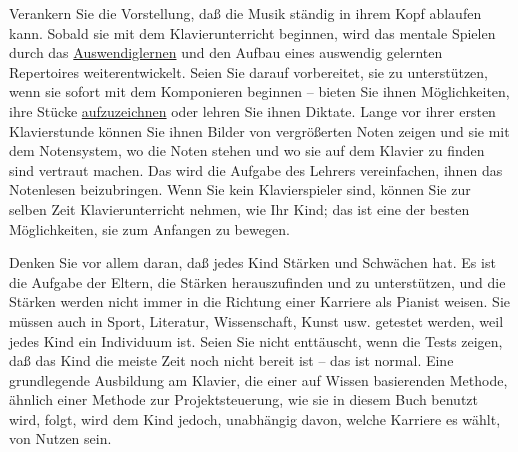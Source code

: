 Verankern Sie die Vorstellung, daß die Musik ständig in ihrem Kopf ablaufen kann.
Sobald sie mit dem Klavierunterricht beginnen, wird das mentale Spielen durch das \hyperref[c1iii6]{Auswendiglernen} und den Aufbau eines auswendig gelernten Repertoires weiterentwickelt.
Seien Sie darauf vorbereitet, sie zu unterstützen, wenn sie sofort mit dem Komponieren beginnen -- bieten Sie ihnen Möglichkeiten, ihre Stücke \hyperref[c1iii13]{aufzuzeichnen} oder lehren Sie ihnen Diktate.
Lange vor ihrer ersten Klavierstunde können Sie ihnen Bilder von vergrößerten Noten zeigen und sie mit dem Notensystem, wo die Noten stehen und wo sie auf dem Klavier zu finden sind vertraut machen.
Das wird die Aufgabe des Lehrers vereinfachen, ihnen das Notenlesen beizubringen.
Wenn Sie kein Klavierspieler sind, können Sie zur selben Zeit Klavierunterricht nehmen, wie Ihr Kind; das ist eine der besten Möglichkeiten, sie zum Anfangen zu bewegen.

Denken Sie vor allem daran, daß jedes Kind Stärken und Schwächen hat.
Es ist die Aufgabe der Eltern, die Stärken herauszufinden und zu unterstützen, und die Stärken werden nicht immer in die Richtung einer Karriere als Pianist weisen.
Sie müssen auch in Sport, Literatur, Wissenschaft, Kunst usw. getestet werden, weil jedes Kind ein Individuum ist.
Seien Sie nicht enttäuscht, wenn die Tests zeigen, daß das Kind die meiste Zeit noch nicht bereit ist -- das ist normal.
Eine grundlegende Ausbildung am Klavier, die einer auf Wissen basierenden Methode, ähnlich einer Methode zur Projektsteuerung, wie sie in diesem Buch benutzt wird, folgt, wird dem Kind jedoch, unabhängig davon, welche Karriere es wählt, von Nutzen sein.

